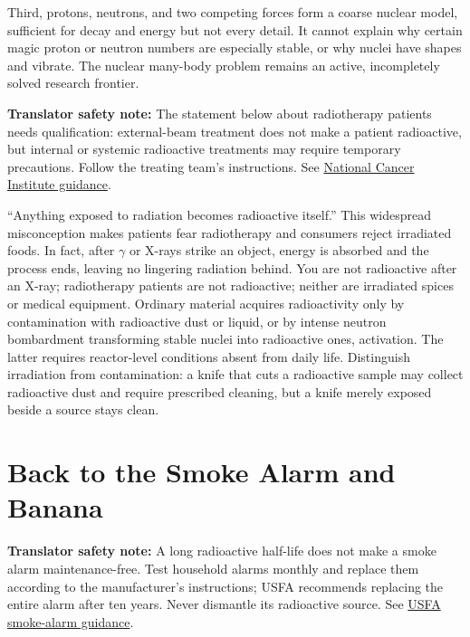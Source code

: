 Third, protons, neutrons, and two competing forces form a coarse nuclear model, sufficient for decay and energy but not every detail. It cannot explain why certain magic proton or neutron numbers are especially stable, or why nuclei have shapes and vibrate. The nuclear many-body problem remains an active, incompletely solved research frontier.

\textbf{Translator safety note:} The statement below about radiotherapy patients needs qualification: external-beam treatment does not make a patient radioactive, but internal or systemic radioactive treatments may require temporary precautions. Follow the treating team's instructions. See \href{https://www.cancer.gov/about-cancer/treatment/types/radiation-therapy}{National Cancer Institute guidance}.

\begin{wuqu}
``Anything exposed to radiation becomes radioactive itself.'' This widespread misconception makes patients fear radiotherapy and consumers reject irradiated foods. In fact, after $\gamma$ or X-rays strike an object, energy is absorbed and the process ends, leaving no lingering radiation behind. You are not radioactive after an X-ray; radiotherapy patients are not radioactive; neither are irradiated spices or medical equipment. Ordinary material acquires radioactivity only by contamination with radioactive dust or liquid, or by intense neutron bombardment transforming stable nuclei into radioactive ones, activation. The latter requires reactor-level conditions absent from daily life. Distinguish irradiation from contamination: a knife that cuts a radioactive sample may collect radioactive dust and require prescribed cleaning, but a knife merely exposed beside a source stays clean.
\end{wuqu}

\section{Back to the Smoke Alarm and Banana}

\textbf{Translator safety note:} A long radioactive half-life does not make a smoke alarm maintenance-free. Test household alarms monthly and replace them according to the manufacturer's instructions; USFA recommends replacing the entire alarm after ten years. Never dismantle its radioactive source. See \href{https://www.usfa.fema.gov/prevention/home-fires/prepare-for-fire/smoke-alarms/}{USFA smoke-alarm guidance}.

